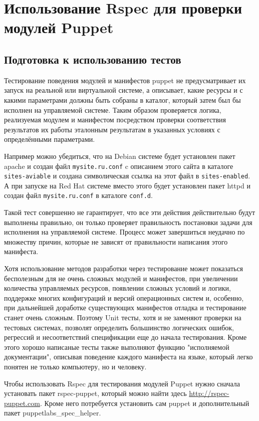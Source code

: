 \section{Использование Rspec для проверки модулей Puppet}

\subsection{Подготовка к использованию тестов}

Тестирование поведения модулей и манифестов puppet не предусматривает их запуск на реальной или виртуальной системе, а описывает, какие ресурсы и с какими параметрами должны быть собраны в каталог, который затем был бы исполнен на управляемой системе. Таким образом проверяется логика, реализуемая модулем и манифестом посредством проверки соответствия результатов их работы эталонным результатам в указанных условиях с определёнными параметрами.

Например можно убедиться, что на Debian системе будет установлен пакет apache и создан файл \texttt{mysite.ru.conf} c описанием этого сайта в каталоге \texttt{sites-aviable}  и создана символическая ссылка на этот файл в \texttt{sites-enabled}. А при запуске на Red Hat системе вместо этого будет установлен пакет httpd и создан файл \texttt{mysite.ru.conf} в каталоге \texttt{conf.d}.

Такой тест совершенно не гарантирует, что все эти действия действительно будут выполнены правильно, он только проверяет правильность постановки задачи для исполнения на управляемой системе. Процесс может завершиться неудачно по множеству причин, которые не зависят от правильности написания этого манифеста.

Хотя использование методов разработки через тестирование может показаться бесполезным для не очень сложных модулей и манифестов, при увеличении количества управляемых ресурсов, появлении сложных условий и логики, поддержке многих конфигураций и версий операционных систем и, особенно, при дальнейшей доработке существующих манифестов отладка и тестирование станет очень сложным. Поэтому Unit тесты, хотя и не заменяют проверки на тестовых системах, позволят определить большинство логических ошибок, регрессий и несоответствий спецификации еще до начала тестирования. Кроме этого хорошо написаные тесты также выполняют функцию "исполняемой документации", описывая поведение каждого манифеста на языке, который легко понятен не только компьютеру, но и человеку.

Чтобы использовать Rspec для тестирования модулей Puppet нужно сначала установать пакет rspec-puppet, который можно найти здесь \url{http://rspec-puppet.com}. Кроме него потребуется установить сам puppet и дополнительный пакет puppetlabs\_spec\_helper.

